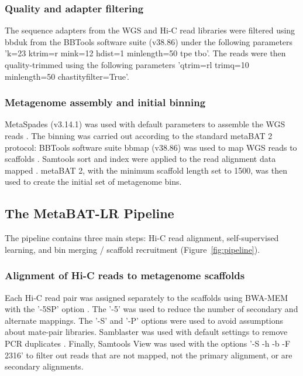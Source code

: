 \documentclass[fleqn,10pt,lineno]{wlpeerj}
\begin{document}
\subsubsection*{Quality and adapter filtering}

The sequence adapters from the WGS and Hi-C read libraries were filtered using bbduk from the BBTools software suite (v38.86) \citep{bushnell2014bbmap} under the following parameters 'k=23 ktrim=r mink=12 hdist=1 minlength=50 tpe tbo'. The reads were then quality-trimmed using the following parameters 'qtrim=rl trimq=10 minlength=50 chastityfilter=True'. 

\subsubsection*{Metagenome assembly and initial binning}

MetaSpades (v3.14.1) was used with default parameters to assemble the WGS reads \citep{nurk2017metaspades}. The binning was carried out according to the standard metaBAT 2 protocol: BBTools software suite bbmap (v38.86) was used to map WGS reads to scaffolds \citep{bushnell2014bbmap}. Samtools sort and index were applied to the read alignment data mapped \citep{li2009sequence}. metaBAT 2, with the minimum scaffold length set to 1500, was then used to create the initial set of metagenome bins.

\subsection*{The MetaBAT-LR Pipeline}

The pipeline contains three main steps: Hi-C read alignment, self-supervised learning, and bin merging / scaffold recruitment (Figure~\ref{fig:pipeline}).

\subsubsection*{Alignment of Hi-C reads to metagenome scaffolds} 

Each Hi-C read pair was assigned separately to the scaffolds using BWA-MEM with the '-5SP' option \citep{li2013aligning}. The '-5' was used to reduce the number of secondary and alternate mappings. The '-S' and '-P' options were used to avoid assumptions about mate-pair libraries. Samblaster was used with default settings to remove PCR duplicates \citep{faust2014samblaster}. Finally, Samtools View was used with the options '-S -h -b -F 2316' to filter out reads that are not mapped, not the primary alignment, or are secondary alignments.  
\end{document}
